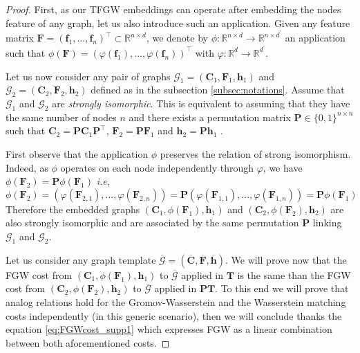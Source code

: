 \documentclass{article}
\def\vf{{\bm{f}}}
\def\vh{{\bm{h}}}
\def\mC{{\bm{C}}}
\def\mF{{\bm{F}}}
\def\mP{{\bm{P}}}
\def\mT{{\bm{T}}}
\newcommand{\R}{\mathbb{R}}
\begin{document}
{\begin{proof}
First, as our TFGW embeddings can operate after embedding the nodes feature of any graph, let us also introduce such an application. Given any feature matrix $\mF=(\vf_1, ..., \vf_n)^\top \subset \R^{n \times d}$, we denote by $\phi : \R^{n \times d} \rightarrow \R^{n \times d^\prime}$ an application such that $\phi(\mF) = (\varphi(\vf_1), ..., \varphi(\vf_n))^\top$ with $\varphi: \R^{d} \rightarrow \R^{d^\prime}$.

Let us now consider any pair of graphs $\mathcal{G}_1=(\mC_1, \mF_1, \vh_1)$ and $\mathcal{G}_2=(\mC_2, \mF_2, \vh_2)$ defined as in the subsection \ref{subsec:notations}. Assume that $\mathcal{G}_1$ and $\mathcal{G}_2$ are \emph{strongly isomorphic}. This is equivalent to assuming that they have the same number of nodes $n$ and there exists a permutation matrix $\mP \in \{0,1\}^{n \times n}$ such that $\mC_2 = \mP \mC_1 \mP^\top$, $\mF_2 = \mP \mF_1$ and $\vh_2 = \mP \vh_1$ \cite{titouan2019optimal,chowdhury-gromov-wasserstein-2019}.





First observe that the application $\phi$ preserves the relation of strong isomorphism. Indeed, as $\phi$ operates on each node independently through $\varphi$, we have $\phi(\mF_2)= \mP \phi(\mF_1)$ \emph{i.e},
\begin{equation}
\phi(\mF_2) = (\varphi(\mF_{2, 1}), ..., \varphi(\mF_{2, n})) = \mP(\varphi(\mF_{1, 1}), ..., \varphi(\mF_{1, n})) = \mP \phi(\mF_1)
\end{equation}
Therefore the embedded graphs $(\mC_1, \phi(\mF_1), \vh_1)$ and $(\mC_2, \phi(\mF_2), \vh_2)$ are also strongly isomorphic and are associated by the same permutation $\mP$ linking $\mathcal{G}_1$ and $\mathcal{G}_2$.

Let us consider any graph template $\overline{\mathcal{G}}= (\overline{\mC}, \overline{\mF}, \overline{\vh})$. We will prove now that the FGW cost from $(\mC_1, \phi(\mF_1), \vh_1)$ to $\overline{\mathcal{G}}$ applied in $\mT$ is the same than the FGW cost from $(\mC_2, \phi(\mF_2), \vh_2)$ to $\overline{\mathcal{G}}$ applied in $\mP\mT$. To this end we will prove that analog relations hold for the Gromov-Wasserstein and the Wasserstein matching costs independently (in this generic scenario), then we will conclude thanks the equation \ref{eq:FGWcost_supp1} which expresses FGW as a linear combination between both aforementioned costs.


\end{proof}}
\end{document}
